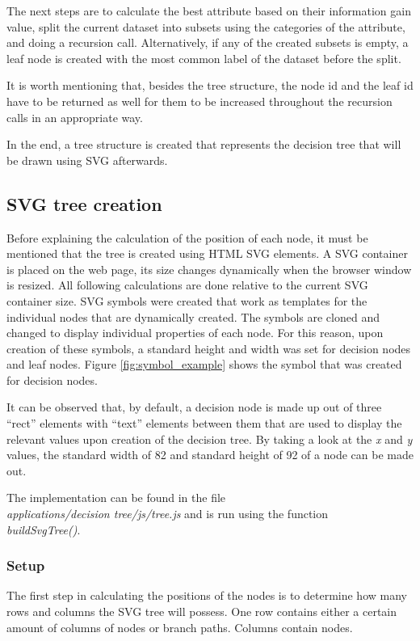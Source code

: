 The next steps are to calculate the best attribute based on their information gain value, split the current dataset into subsets using the categories of the attribute, and doing a recursion call.
Alternatively, if any of the created subsets is empty, a leaf node is created with the most common label of the dataset before the split.

It is worth mentioning that, besides the tree structure, the node id and the leaf id have to be returned as well for them to be increased throughout the recursion calls in an appropriate way.

In the end, a tree structure is created that represents the decision tree that will be drawn using SVG afterwards.

\subsection{SVG tree creation}
Before explaining the calculation of the position of each node, it must be mentioned that the tree is created using HTML SVG elements. A SVG container is placed on the web page, its size changes dynamically when the browser window is resized. All following calculations are done relative to the current SVG container size. SVG symbols were created that work as templates for the individual nodes that are dynamically created. The symbols are cloned and changed to display individual properties of each node. For this reason, upon creation of these symbols, a standard height and width was set for decision nodes and leaf nodes. Figure \ref{fig:symbol_example} shows the symbol that was created for decision nodes.

It can be observed that, by default, a decision node is made up out of three ``rect'' elements with ``text'' elements between them that are used to display the relevant values upon creation of the decision tree. By taking a look at the \textit{x} and \textit{y} values, the standard width of 82 and standard height of 92 of a node can be made out.

The implementation can be found in the file\\ \textit{applications/decision tree/js/tree.js} and is run using the function\\
\textit{buildSvgTree()}.

\subsubsection{Setup}
The first step in calculating the positions of the nodes is to determine how many rows and columns the SVG tree will possess. One row contains either a certain amount of columns of nodes or branch paths. Columns contain nodes.

